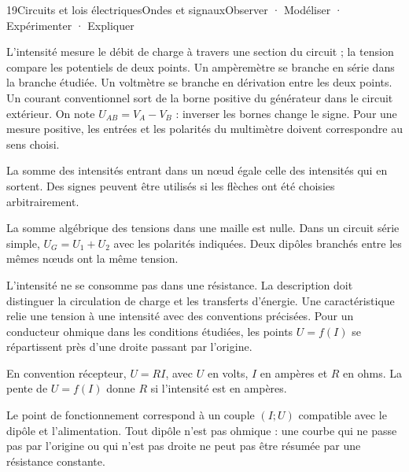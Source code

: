 \begin{ouverture}[piles]{19}{Circuits et lois électriques}{Ondes et signaux}{Observer · Modéliser · Expérimenter · Expliquer}
\end{ouverture}
\essentiel
{}
L'intensité mesure le débit de charge à travers une section du circuit ; la tension compare les potentiels de deux points. Un ampèremètre se branche en série dans la branche étudiée. Un voltmètre se branche en dérivation entre les deux points. Un courant conventionnel sort de la borne positive du générateur dans le circuit extérieur.
On note $U_{AB}=V_A-V_B$ : inverser les bornes change le signe. Pour une mesure positive, les entrées et les polarités du multimètre doivent correspondre au sens choisi.
\begin{loi}La somme des intensités entrant dans un nœud égale celle des intensités qui en sortent. Des signes peuvent être utilisés si les flèches ont été choisies arbitrairement.\end{loi}
\begin{loi}La somme algébrique des tensions dans une maille est nulle. Dans un circuit série simple, $U_G=U_1+U_2$ avec les polarités indiquées. Deux dipôles branchés entre les mêmes nœuds ont la même tension.\end{loi}
L'intensité ne se consomme pas dans une résistance. La description doit distinguer la circulation de charge et les transferts d'énergie.
Une caractéristique relie une tension à une intensité avec des conventions précisées. Pour un conducteur ohmique dans les conditions étudiées, les points $U=f(I)$ se répartissent près d'une droite passant par l'origine.
\begin{loi}En convention récepteur, $U=RI$, avec $U$ en volts, $I$ en ampères et $R$ en ohms. La pente de $U=f(I)$ donne $R$ si l'intensité est en ampères.\end{loi}
Le point de fonctionnement correspond à un couple $(I;U)$ compatible avec le dipôle et l'alimentation. Tout dipôle n'est pas ohmique : une courbe qui ne passe pas par l'origine ou qui n'est pas droite ne peut pas être résumée par une résistance constante.
